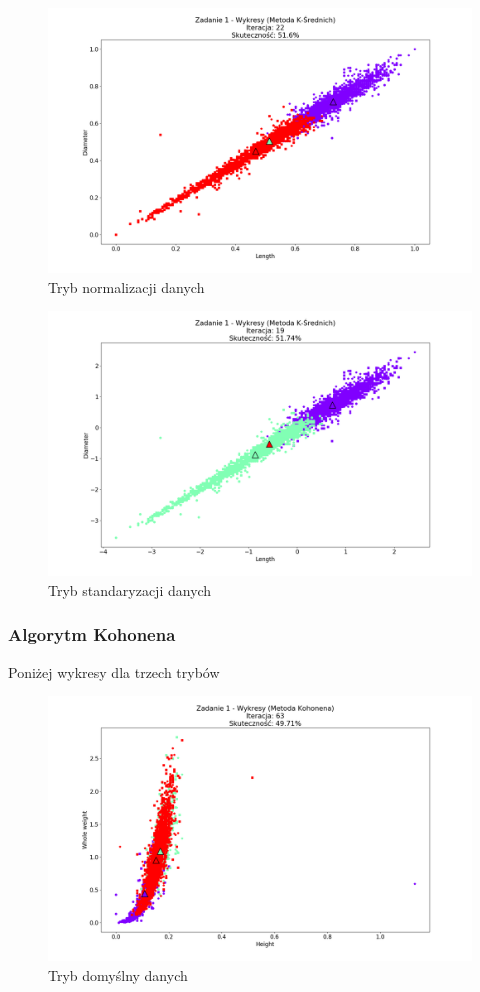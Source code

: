 \documentclass{classrep}
\begin{document}
{{{				\begin{figure}[!htbp]
					\centering
					\includegraphics[width=\textwidth,width=95mm]{wykresy/plot_k_meansAbaloneNormalised.png}
					\caption{Tryb normalizacji danych}
				\end{figure}
		
				\begin{figure}[!htbp]
					\centering
					\includegraphics[width=\textwidth,width=95mm]{wykresy/plot_k_meansAbaloneStandardise.png}
					\caption{Tryb standaryzacji danych}
				\end{figure}
			\FloatBarrier
		}

		\subsubsection{Algorytm Kohonena}
		{
			Poniżej wykresy dla trzech trybów
				\begin{figure}[!htbp]
					\centering
					\includegraphics[width=\textwidth,width=95mm]{wykresy/plot_kohonenAbaloneDefault.png}
					\caption{Tryb domyślny danych}
				\end{figure}
			
}}}
\end{document}
